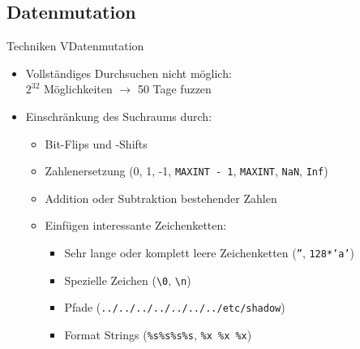 \documentclass[ngerman,aspectratio=1610,12pt]{beamer}
\begin{document}
\subsection*{Datenmutation}
\begin{frame}{Techniken V}{Datenmutation\\}
  \begin{itemize}

    \item Vollständiges Durchsuchen nicht möglich: \\ $2^{32}$ Möglichkeiten $\rightarrow$ 50 Tage fuzzen
    \item Einschränkung des Suchraums durch:
    \begin{itemize} 
      \item Bit-Flips und -Shifts
      \item Zahlenersetzung (0, 1, -1, \texttt{MAXINT - 1}, \texttt{MAXINT}, \texttt{NaN}, \texttt{Inf})
      \item Addition oder Subtraktion bestehender Zahlen
      \item Einfügen interessante Zeichenketten:
      \begin{itemize}
        \item Sehr lange oder komplett leere Zeichenketten (\texttt{''}, \texttt{128*'a'})
        \item Spezielle Zeichen (\texttt{\textbackslash 0}, \texttt{\textbackslash n})
        \item Pfade (\texttt{../../../../../../../etc/shadow})
        \item Format Strings (\texttt{\%s\%s\%s\%s}, \texttt{\%x \%x \%x}) %
      \end{itemize}
    \end{itemize}
  \end{itemize}
\end{frame}
\end{document}
